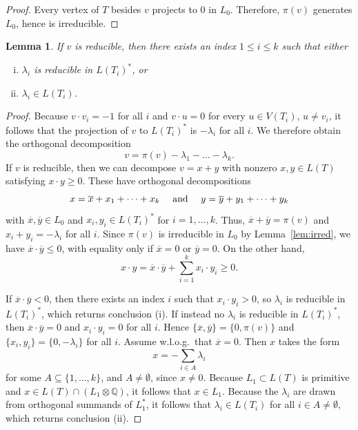 \documentclass[11pt]{amsart}
\newtheorem{lem}[thm]{Lemma}
\numberwithin{equation}{section}
\def\bQ{{\mathbb Q}}
\begin{document}
\begin{proof}
Every vertex of $T$ besides $v$ projects to 0 in $L_0$.
Therefore, $\pi(v)$ generates $L_0$, hence is irreducible.
\end{proof}

\begin{lem}
\label{lem:reducible_dichotomy}
    If $v$ is reducible, then there exists an index $1\leq i\leq k$ such that either
    \begin{enumerate}[(i)]
        \item $\lambda_i$ is reducible in $L(T_i)^*$, or
        \item $\lambda_i\in L(T_i)$.
    \end{enumerate}
\end{lem}

\begin{proof}
Because $v \cdot v_i = -1$ for all $i$ and $v \cdot u = 0$ for every $u \in V(T_i)$, $u \ne v_i$, it follows that the projection of $v$ to $L(T_i)^*$ is $-\lambda_i$ for all $i$.
We therefore obtain the orthogonal decomposition
\[
v=\pi(v)-\lambda_1-\dots- \lambda_k.
\]
If $v$ is reducible, then we can decompose $v=x+y$ with nonzero $x,y\in L(T)$ satisfying $x\cdot y\geq 0$.
These have orthogonal decompositions
\[
\text{$x=\overline{x}+ x_1 +\dots + x_k$ \quad and \quad $y=\overline{y}+ y_1 +\dots + y_k$}
\]
with $\overline{x},\overline{y}\in L_0$ and $x_i,y_i\in L(T_i)^*$ for $i=1,\dots, k$.
Thus, $\overline{x}+\overline{y}=\pi(v)$ and $x_i+y_i=-\lambda_i$ for all $i$.
Since $\pi(v)$ is irreducible in $L_0$ by Lemma~\ref{lem:irred}, we have  $\overline{x}\cdot \overline{y}\leq 0$, with equality only if $\overline{x}=0$ or $\overline{y}=0$.
On the other hand,
\[
x\cdot y= \overline{x}\cdot \overline{y} + \sum_{i=1}^k x_i\cdot y_i\geq 0.
\]

If $\overline{x}\cdot \overline{y}<0$, then there exists an index $i$ such that $x_i\cdot y_i>0$, so $\lambda_i$ is reducible in $L(T_i)^*$, which returns conclusion (i).
If instead no $\lambda_i$ is reducible in $L(T_i)^*$, then $\overline{x} \cdot \overline{y} = 0$ and $x_i \cdot y_i = 0$ for all $i$.
Hence $\{ \overline{x}, \overline{y} \} = \{ 0 , \pi(v) \}$ and $\{ x_i, y_i \} = \{ 0 , -\lambda_i \}$ for all $i$.
Assume w.l.o.g.~that $\overline{x}=0$.
Then $x$ takes the form
\[
x=-\sum_{i\in A} \lambda_i
\]
for some $A\subseteq \{1,\dots, k\}$, and $A \ne \emptyset$, since $x \ne 0$.
Because $L_1 \subset L(T)$ is primitive and $x \in L(T) \cap (L_1 \otimes 
\bQ)$, it follows that $x \in L_1$.
Because the $\lambda_i$ are drawn from orthogonal summands of $L_1^*$, it follows that $\lambda_i \in L(T_i)$ for all $i \in A \ne \emptyset$, which returns conclusion (ii).
\end{proof}
\end{document}
